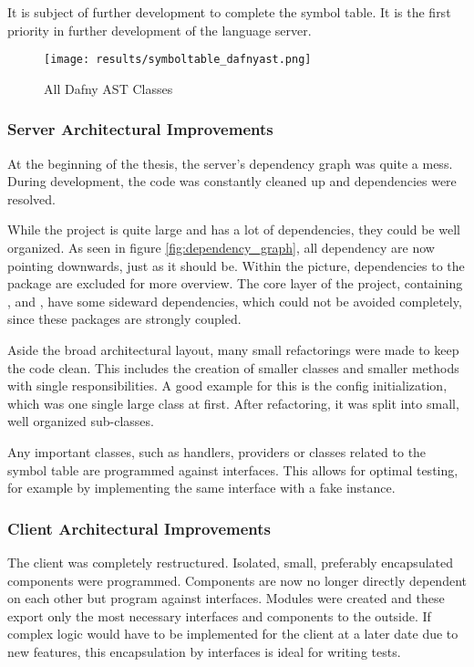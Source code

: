 
It is subject of further development to complete the symbol table.
It is the first priority in further development of the language server.
\begin{figure}[h]
    \centering
    \texttt{[image: results/symboltable\_dafnyast.png]}
    \caption{All Dafny AST Classes}
    \label{fig:dafnyASTOverview}
\end{figure}

\subsubsection{Server Architectural Improvements}
At the beginning of the thesis, the server's dependency graph was quite a mess.
During development, the code was constantly cleaned up and dependencies were resolved.

While the project is quite large and has a lot of dependencies, they could be well organized.
As seen in figure \ref{fig:dependency_graph}, all dependency are now pointing downwards, just as it should be.
Within the picture, dependencies to the  package are excluded for more overview.
The core layer of the project, containing ,  and , have some sideward dependencies, which could not be avoided completely, since these packages are strongly coupled.

Aside the broad architectural layout, many small refactorings were made to keep the code clean.
This includes the creation of smaller classes and smaller methods with single responsibilities.
A good example for this is the config initialization, which was one single large class at first.
After refactoring, it was split into small, well organized sub-classes.

Any important classes, such as handlers, providers or classes related to the symbol table are programmed against interfaces.
This allows for optimal testing, for example by implementing the same interface with a fake instance.

\subsubsection{Client Architectural Improvements}
The client was completely restructured.
Isolated, small, preferably encapsulated components were programmed.
Components are now no longer directly dependent on each other but program against interfaces.
Modules were created and these export only the most necessary interfaces and components to the outside.
If complex logic would have to be implemented for the client at a later date due to new features,
this encapsulation by interfaces is ideal for writing tests. \\


